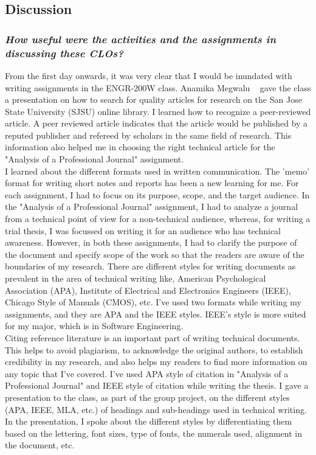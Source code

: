 \documentclass[letterpaper,12pt]{texMemo}
\begin{document}
\begin{singlespacing}
\section*{Discussion}

\subsubsection*{\textit{How useful were the activities and the assignments in discussing these CLOs?}}
From the first day onwards, it was very clear that I would be inundated with writing assignments in the ENGR-200W class. Anamika Megwalu ~\citep{AnamikaM1:online} gave the class a presentation on how to search for quality articles for research on the San Jose State University (SJSU) online library. I learned how to recognize a peer-reviewed article. A peer reviewed article indicates that the article would be published by a reputed publisher and refereed by scholars in the same field of research. This information also helped me in choosing the right technical article for the "Analysis of a Professional Journal" assignment.\\
I learned about the different formats used in written communication. The 'memo' format for writing short notes and reports has been a new learning for me. For each assignment, I had to focus on its purpose, scope, and the target audience. In the "Analysis of a Professional Journal" assignment, I had to analyze a journal from a technical point of view for a non-technical audience, whereas, for writing a trial thesis, I was focussed on writing it for an audience who has technical awareness. However, in both these assignments, I had to clarify the purpose of the document and specify scope of the work so that the readers are aware of the boundaries of my research. There are different styles for writing documents as prevalent in the area of technical writing like, American Psychological Association (APA), Institute of Electrical and Electronics Engineers (IEEE), Chicago Style of Manuals (CMOS), etc. I've used two formats while writing my assignments, and they are APA and the IEEE styles. IEEE's style is more suited for my major, which is in Software Engineering.\\ 
Citing reference literature is an important part of writing technical documents. This helps to avoid plagiarism, to acknowledge the original authors, to establish credibility in my research, and also helps my readers to find more information on any topic that I've covered. I've used APA style of citation in "Analysis of a Professional Journal" and IEEE style of citation while writing the thesis. I gave a presentation to the class, as part of the group project, on the different styles (APA, IEEE, MLA, etc.) of headings and sub-headings used in technical writing. In the presentation, I spoke about the different styles by differentiating them based on the lettering, font sizes, type of fonts, the numerals used, alignment in the document, etc. \\ 

\end{singlespacing}
\end{document}
